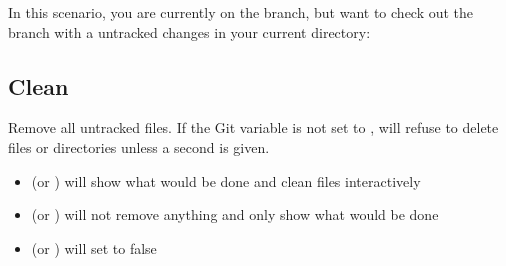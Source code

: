 \begin{flushleft}
	In this scenario, you are currently on the  branch, but want
	to check out the  branch with a untracked changes in your
	current directory:
\end{flushleft}

\begin{flushleft}
\end{flushleft}
\vspace{-0.6cm}
\begin{flushleft}
\end{flushleft}
\vspace{-0.6cm}
\begin{flushleft}
\end{flushleft}
\vspace{-0.6cm}
\begin{flushleft}
\end{flushleft}
\vspace{-0.6cm}
\begin{flushleft}
\end{flushleft}


\subsection{Clean}\label{git-clean}

\begin{flushleft}
	Remove all untracked files. If the Git variable  is
	not set to ,  will refuse to delete files or directories
	unless a second  is given.
\end{flushleft}

\begin{flushleft}
\end{flushleft}

\begin{itemize}
	\item {} (or ) will show what would be done and clean files interactively
	\item {} (or ) will not remove anything and only show what would be done
	\item {} (or ) will set  to false
\end{itemize}
